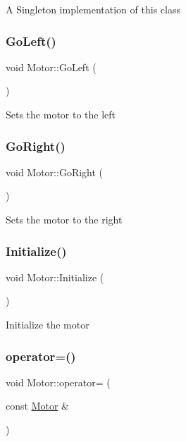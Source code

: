 A Singleton implementation of this class \hypertarget{class_motor_accc1f6815534eb7e7d694dce8d7be3a9}{}\label{class_motor_accc1f6815534eb7e7d694dce8d7be3a9} 
\subsubsection{\texorpdfstring{Go\+Left()}{GoLeft()}}
{\footnotesize\ttfamily void Motor\+::\+Go\+Left (\begin{DoxyParamCaption}{ }\end{DoxyParamCaption})}

Sets the motor to the left \hypertarget{class_motor_aa7fc3ff7511fb88f3dff67587003ca2d}{}\label{class_motor_aa7fc3ff7511fb88f3dff67587003ca2d} 
\subsubsection{\texorpdfstring{Go\+Right()}{GoRight()}}
{\footnotesize\ttfamily void Motor\+::\+Go\+Right (\begin{DoxyParamCaption}{ }\end{DoxyParamCaption})}

Sets the motor to the right \hypertarget{class_motor_afa5bb4104353e750563252099b6261ca}{}\label{class_motor_afa5bb4104353e750563252099b6261ca} 
\subsubsection{\texorpdfstring{Initialize()}{Initialize()}}
{\footnotesize\ttfamily void Motor\+::\+Initialize (\begin{DoxyParamCaption}{ }\end{DoxyParamCaption})}

Initialize the motor \hypertarget{class_motor_afd01e338a159f04706f6a0b95e8e2bd9}{}\label{class_motor_afd01e338a159f04706f6a0b95e8e2bd9} 
\subsubsection{\texorpdfstring{operator=()}{operator=()}}
{\footnotesize\ttfamily void Motor\+::operator= (\begin{DoxyParamCaption}\item[{const \hyperlink{class_motor}{Motor} \&}]{ }\end{DoxyParamCaption})\hspace{0.3cm}{\ttfamily [delete]}}

